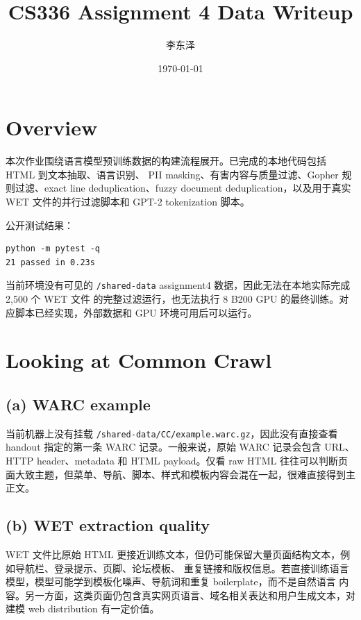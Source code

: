 \documentclass[UTF8,11pt]{ctexart}
\title{CS336 Assignment 4 Data Writeup}
\author{李东泽}
\date{\today}
\begin{document}
\maketitle

\section{Overview}

本次作业围绕语言模型预训练数据的构建流程展开。已完成的本地代码包括 HTML 到文本抽取、语言识别、
PII masking、有害内容与质量过滤、Gopher 规则过滤、exact line deduplication、fuzzy document
deduplication，以及用于真实 WET 文件的并行过滤脚本和 GPT-2 tokenization 脚本。

公开测试结果：

\begin{lstlisting}
python -m pytest -q
21 passed in 0.23s
\end{lstlisting}

当前环境没有可见的 \texttt{/shared-data} assignment4 数据，因此无法在本地实际完成 2,500 个 WET 文件
的完整过滤运行，也无法执行 8 B200 GPU 的最终训练。对应脚本已经实现，外部数据和 GPU 环境可用后可以运行。

\section{Looking at Common Crawl}

\subsection*{(a) WARC example}

当前机器上没有挂载 \texttt{/shared-data/CC/example.warc.gz}，因此没有直接查看 handout 指定的第一条
WARC 记录。一般来说，原始 WARC 记录会包含 URL、HTTP header、metadata 和 HTML payload。仅看 raw
HTML 往往可以判断页面大致主题，但菜单、导航、脚本、样式和模板内容会混在一起，很难直接得到主正文。

\subsection*{(b) WET extraction quality}

WET 文件比原始 HTML 更接近训练文本，但仍可能保留大量页面结构文本，例如导航栏、登录提示、页脚、论坛模板、
重复链接和版权信息。若直接训练语言模型，模型可能学到模板化噪声、导航词和重复 boilerplate，而不是自然语言
内容。另一方面，这类页面仍包含真实网页语言、域名相关表达和用户生成文本，对建模 web distribution 有一定价值。
\end{document}

